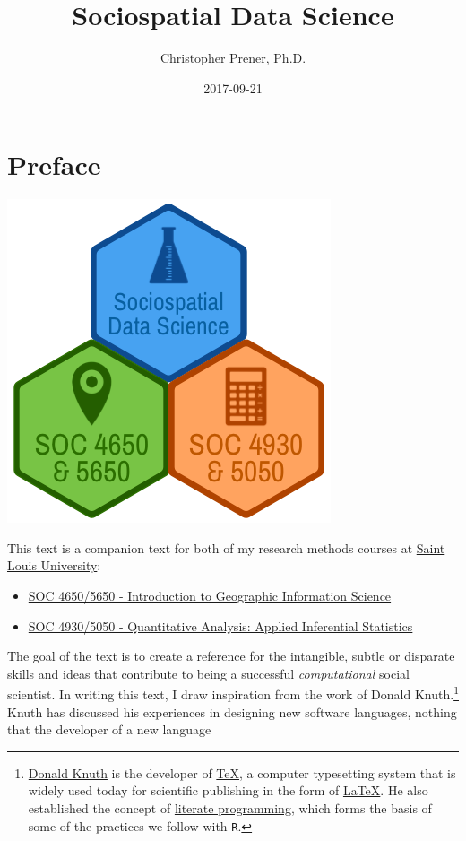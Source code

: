 \documentclass[]{book}
\title{Sociospatial Data Science}
\author{Christopher Prener, Ph.D.}
\date{2017-09-21}
\providecommand{\tightlist}{%
  \setlength{\itemsep}{0pt}\setlength{\parskip}{0pt}}
\let\rmarkdownfootnote\footnote%
\def\footnote{\protect\rmarkdownfootnote}
\theoremstyle{definition}
\theoremstyle{definition}
\theoremstyle{definition}
\theoremstyle{remark}
\begin{document}
\maketitle

{
\setcounter{tocdepth}{1}
\tableofcontents
}
\chapter*{Preface}\label{preface}

\begin{center}\includegraphics[width=0.4\linewidth]{images/SSDSBookBanner} \end{center}

This text is a companion text for both of my research methods courses at
\href{https://slu.edu}{Saint Louis University}:

\begin{itemize}
\tightlist
\item
  \href{https://slu-soc5650.github.io}{SOC 4650/5650 - Introduction to
  Geographic Information Science}
\item
  \href{https://slu-soc5050.github.io}{SOC 4930/5050 - Quantitative
  Analysis: Applied Inferential Statistics}
\end{itemize}

The goal of the text is to create a reference for the intangible, subtle
or disparate skills and ideas that contribute to being a successful
\emph{computational} social scientist. In writing this text, I draw
inspiration from the work of Donald Knuth.\footnote{\href{https://en.wikipedia.org/wiki/Donald_Knuth}{Donald
  Knuth} is the developer of
  \href{https://en.wikipedia.org/wiki/TeX}{TeX}, a computer typesetting
  system that is widely used today for scientific publishing in the form
  of \href{https://en.wikipedia.org/wiki/LaTeX}{LaTeX}. He also
  established the concept of
  \href{https://en.wikipedia.org/wiki/Literate_programming}{literate
  programming}, which forms the basis of some of the practices we follow
  with \texttt{R}.} Knuth has discussed his experiences in designing new
software languages, nothing that the developer of a new language
\end{document}
